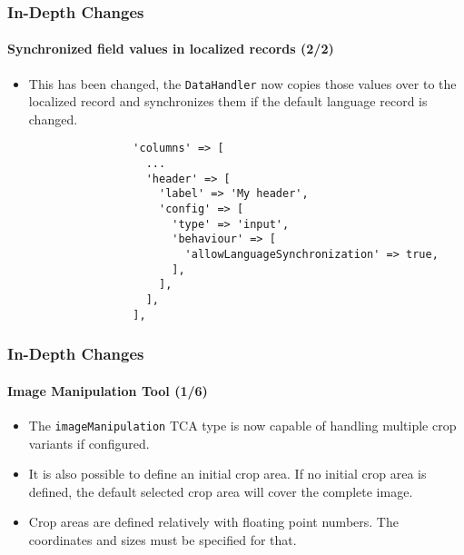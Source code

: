 
\begin{frame}[fragile]
	\frametitle{In-Depth Changes}
	\framesubtitle{Synchronized field values in localized records (2/2)}

	\lstset{basicstyle=\tiny\ttfamily}

	\begin{itemize}
		\item This has been changed, the \texttt{DataHandler} now copies those values over to the localized
			record and synchronizes them if the default language record is changed.

			\begin{lstlisting}
				'columns' => [
				  ...
				  'header' => [
				    'label' => 'My header',
				    'config' => [
				      'type' => 'input',
				      'behaviour' => [
				        'allowLanguageSynchronization' => true,
				      ],
				    ],
				  ],
				],
			\end{lstlisting}

	\end{itemize}

\end{frame}


\begin{frame}[fragile]
	\frametitle{In-Depth Changes}
	\framesubtitle{Image Manipulation Tool (1/6)}

	\lstset{basicstyle=\tiny\ttfamily}

	\begin{itemize}
		\item The \texttt{imageManipulation} TCA type is now capable of handling multiple crop variants if configured.

		\item It is also possible to define an initial crop area. If no initial crop area is defined,
			the default selected crop area will cover the complete image.
		\item Crop areas are defined relatively with floating point numbers. The coordinates and
			sizes must be specified for that.

	\end{itemize}

\end{frame}

